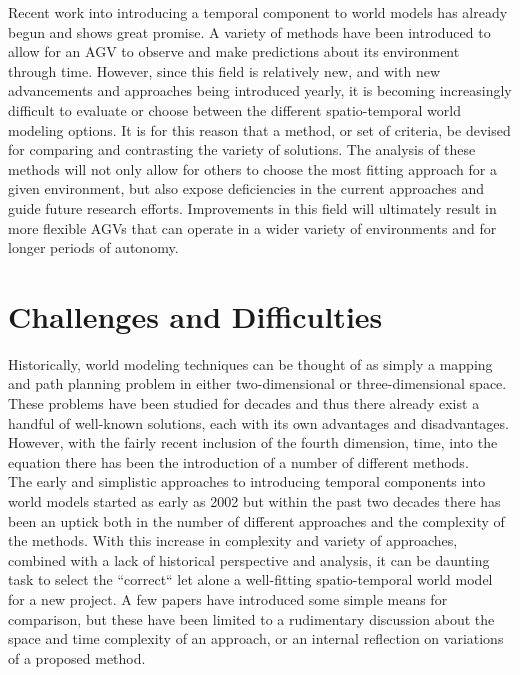   Recent work into introducing a temporal component to world models has
  already begun and shows great promise. A variety of methods have been
  introduced to allow for an AGV to observe and make predictions about its
  environment through time. However, since this field is relatively new, and
  with new advancements and approaches being introduced yearly, it is becoming
  increasingly difficult to evaluate or choose between the
  different spatio-temporal world modeling options. It is for this reason that a
  method, or set of criteria, be devised for comparing and contrasting the
  variety of solutions. The analysis of these methods will not only allow for
  others to choose the most fitting approach for a given environment, but also
  expose deficiencies in the current approaches and guide future research
  efforts. Improvements in this field will ultimately result in more flexible
  AGVs that can operate in a wider variety of environments and for longer
  periods of autonomy. \\

  \section{ Challenges and Difficulties }

  Historically, world modeling techniques can be thought of as simply a mapping
  and path planning problem in either two-dimensional or three-dimensional space.
  These problems have been studied for decades and thus there already exist a
  handful of well-known solutions, each with its own advantages and
  disadvantages. However, with the fairly recent inclusion of the fourth
  dimension, time, into the equation there has been the introduction of a number
  of different methods. \\

  The early and simplistic approaches to introducing temporal components into
  world models started as early as 2002 \cite{Arbuckle2002} but within the past
  two decades there has been an uptick both in the number of different
  approaches and the complexity of the methods.
  With this increase in complexity and variety of approaches,
  combined with a lack of historical perspective and analysis, it can be
  daunting task to select the ``correct`` let alone a well-fitting spatio-temporal
  world model for a new project. A few papers have introduced some simple means
  for comparison, but these have been limited to a rudimentary discussion about the
  space and time complexity of an approach, or an internal reflection on
  variations of a proposed method. \\


